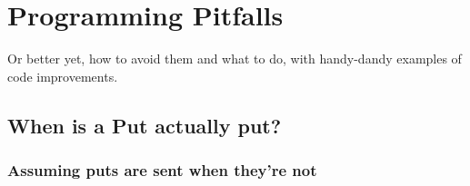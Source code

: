 %
% 
% 
% 
% 
% 
% 
%


\chapter{\openshmem Programming Pitfalls}

Or better yet, how to avoid them and what to do, with handy-dandy
examples of code improvements.

\section{When is a Put actually put?}

\subsection{Assuming puts are sent when they're not}


